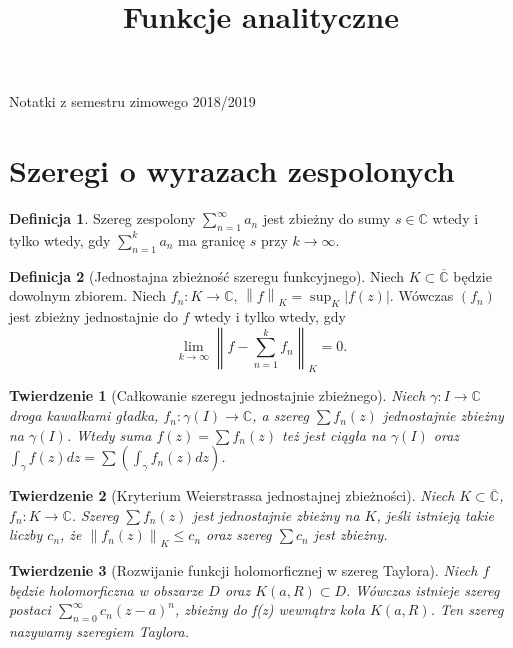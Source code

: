 \documentclass[11pt]{article}
\title{Funkcje analityczne}
\newcommand{\abs}[1]{\left|#1\right|} %
\newcommand{\norm}[1]{\left\lVert#1\right\rVert} %
\newcommand{\extcomplex}{\overline{\mathbb{C}}} %
\theoremstyle{plain}
\newtheorem*{theorem}{Twierdzenie}
\theoremstyle{definition}
\newtheorem*{definition}{Definicja}
\theoremstyle{remark}
\begin{document}
{\huge\bfseries\@title\par}
\vspace{0.1cm}
{\Large Notatki z semestru zimowego 2018/2019\par}


\section{Szeregi o wyrazach zespolonych}

\begin{definition}
  Szereg zespolony $\sum_{n=1}^{\infty} a_{n}$ jest zbieżny do sumy $ s \in \mathbb{C} $ wtedy i tylko wtedy, gdy $ \sum_{n=1}^{k} a_{n} $ ma granicę $ s $ przy $ k\to\infty $.
\end{definition}

\begin{definition}[Jednostajna zbieżność szeregu funkcyjnego]
  Niech $ K \subset \extcomplex $ będzie dowolnym zbiorem. Niech $ f_{n} \colon K \to \mathbb{C} $, $ \norm{f}_{K} = \sup_{K}\abs{f(z)} $. Wówczas $ (f_{n}) $ jest zbieżny jednostajnie do $ f $ wtedy i tylko wtedy, gdy
  $$ \lim_{k\to\infty} \norm{f - \sum_{n=1}^{k} f_{n}}_{K} = 0. $$
\end{definition}

\begin{theorem}[Całkowanie szeregu jednostajnie zbieżnego]
  Niech $ \gamma \colon I \to \mathbb{C} $ droga kawałkami gładka, $ f_{n} \colon \gamma(I) \to \mathbb{C} $, a szereg $ \sum f_{n}(z) $ jednostajnie zbieżny na $ \gamma(I) $. Wtedy suma $ f(z) = \sum f_{n}(z) $ też jest ciągła na $ \gamma(I) $ oraz $ \int_{\gamma} f(z) dz = \sum (\int_{\gamma} f_{n}(z) dz) $.
\end{theorem}

\begin{theorem}[Kryterium Weierstrassa jednostajnej zbieżności]
  Niech $ K \subset \extcomplex $, $ f_{n} \colon K \to \mathbb{C} $. Szereg $ \sum f_{n}(z) $ jest jednostajnie zbieżny na $ K $, jeśli istnieją takie liczby $ c_{n} $, że $ \norm{f_n(z)}_K \leq c_{n} $ oraz szereg $ \sum c_{n} $ jest zbieżny.
\end{theorem}

\begin{adjustbox}{valign=C,raise=0em,minipage={1.0\linewidth}}
\setlength{\columnsep}{0.5cm}
\begin{wrapfigure}{r}{4cm}
    \vspace*{-1.5em}
    \resizebox{\linewidth}{!}{}
\end{wrapfigure}
\strut{}
\vspace*{-1.9em}

\begin{theorem}[Rozwijanie funkcji holomorficznej w szereg Taylora]
  Niech $ f $ będzie holomorficzna w obszarze $ D $ oraz $ K(a, R) \subset D $. Wówczas istnieje szereg postaci $ \sum_{n = 0}^{\infty} c_{n}(z-a)^{n} $, zbieżny do f(z) wewnątrz koła $ K(a, R) $. Ten szereg nazywamy szeregiem Taylora.
\end{theorem}

\end{adjustbox}
\end{document}
